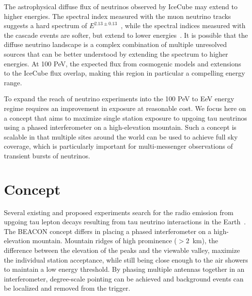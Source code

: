 \documentclass{PoS}
\begin{document}
The astrophysical diffuse flux of neutrinos observed by IceCube may extend to higher energies. The spectral index measured with the muon neutrino tracks suggests a hard spectrum of $E^{2.13\pm0.13}$~\cite{IceCube_muon}, while the spectral indices measured with the cascade events are softer, but extend to lower energies~\cite{HESE, combined}. It is possible that the diffuse neutrino landscape is a complex combination of multiple unresolved sources that can be better understood by extending the spectrum to higher energies. At 100 PeV, the expected flux from cosmogenic models and extensions to the IceCube flux overlap, making this region in particular a compelling energy range. 

To expand the reach of neutrino experiments into the 100 PeV to EeV energy regime requires an improvement in exposure at reasonable cost. We focus here on a concept that aims to maximize single station exposure to upgoing tau neutrinos using a phased interferometer on a high-elevation mountain. Such a concept is scalable in that multiple sites around the world can be used to achieve full sky coverage, which is particularly important for multi-messenger observations of transient bursts of neutrinos.

\section{Concept}
Several existing and proposed experiments search for the radio emission from  upgoing tau lepton decays resulting from tau neutrino interactions in the Earth~\cite{Auger, GRAND, Trinity, POEMMA}. The BEACON concept differs in placing a phased interferometer on a high-elevation mountain. Mountain ridges of high prominence ($>2$~km), the difference between the elevation of the peaks and the viewable valley, maximize the individual station acceptance, while still being close enough to the air showers to maintain a low energy threshold. By phasing multiple antennas together in an interferometer, degree-scale pointing can be achieved and background events can be localized and removed from the trigger.
\end{document}
